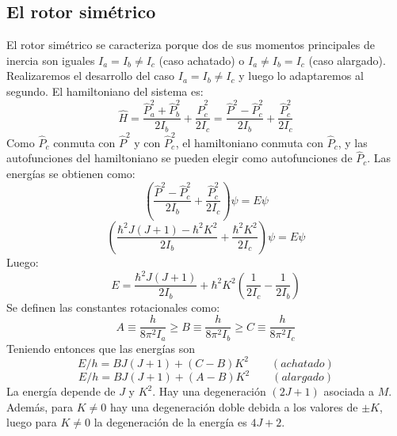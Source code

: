 \documentclass[a4paper]{article}
\begin{document}
\subsection{El rotor simétrico}
El rotor simétrico se caracteriza porque dos de sus momentos principales de inercia son iguales $I_a=I_b\neq I_c$ (caso achatado) o $I_a\neq I_b=I_c$ (caso alargado). Realizaremos el desarrollo del caso $I_a=I_b\neq I_c$ y luego lo adaptaremos al segundo. 
El hamiltoniano del sistema es:
\begin{equation}
\hat H=\frac{\hat P_a^2+\hat P_b^2}{2I_b}+\frac{\hat P_c^2}{2I_c}=\frac{\hat P^2- \hat P_c^2}{2I_b}+\frac{\hat P_c^2}{2I_c}
\end{equation}
Como $\hat P_c$ conmuta con $\hat P^2$ y con $\hat P_c^2$, el hamiltoniano conmuta con $\hat P_c$, y las autofunciones del hamiltoniano se pueden elegir como autofunciones de $\hat P_c$.
Las energías se obtienen como: $$\left(\frac{\hat P^2- \hat P_c^2}{2I_b}+\frac{\hat P_c^2}{2I_c}\right)\psi=E\psi$$
 $$\left(\frac{\hbar^2J(J+1)- \hbar^2K^2}{2I_b}+\frac{\hbar^2K^2}{2I_c}\right)\psi=E\psi$$
 Luego:
 \begin{equation}
 E=\frac{\hbar^2J(J+1)}{2I_b}+\hbar^2K^2\left(\frac{1}{2I_c}-\frac{1}{2I_b}\right)
 \end{equation}
 Se definen las constantes rotacionales como:
 \begin{equation}
 A \equiv \frac{h}{8\pi^2I_a}\geq B\equiv \frac{h}{8\pi^2I_b}\geq C\equiv \frac{h}{8\pi^2I_c}
 \end{equation}
 Teniendo entonces que las energías son
 \begin{equation}
 E/h=BJ\left(J+1\right)+\left(C-B\right)K^2 \qquad (achatado)
 \end{equation}
 \begin{equation}
 E/h=BJ\left(J+1\right)+\left(A-B\right)K^2 \qquad (alargado)
 \end{equation}
La energía depende de $J$ y $K^2$. Hay una degeneración $(2J+1)$ asociada a $M$. Además, para $K\neq 0$ hay una degeneración doble debida a los valores de $\pm K$, luego para $K\neq 0$ la degeneración de la energía es $4J+2$.
\end{document}
